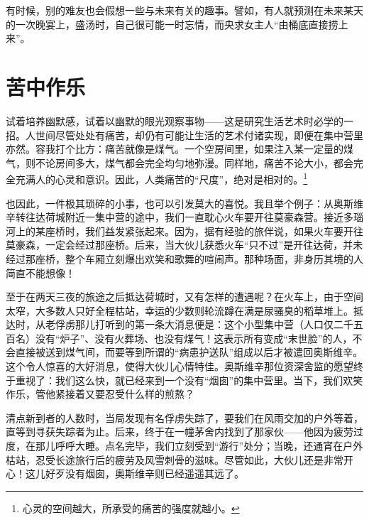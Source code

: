 \documentclass[11pt,oneside]{book}
\begin{document}
\begin{common-format}
有时候，别的难友也会假想一些与未来有关的趣事。譬如，有人就预测在未来某天的一次晚宴上，盛汤时，自己很可能一时忘情，而央求女主人“由桶底直接捞上来”。


\section{苦中作乐}
试着培养幽默感，试着以幽默的眼光观察事物——这是研究生活艺术时必学的一招。人世间尽管处处有痛苦，却仍有可能让生活的艺术付诸实现，即便在集中营里亦然。容我打个比方：痛苦就像是煤气。一个空房间里，如果注入某一定量的煤气，则不论房间多大，煤气都会完全均匀地弥漫。同样地，痛苦不论大小，都会完全充满人的心灵和意识。因此，人类痛苦的“尺度”，绝对是相对的。\footnote{心灵的空间越大，所承受的痛苦的强度就越小。}

也因此，一件极其琐碎的小事，也可以引发莫大的喜悦。我且举个例子：从奥斯维辛转往达荷城附近一集中营的途中，我们一直耽心火车要开往莫豪森营。接近多瑙河上的某座桥时，我们益发紧张起来。因为，据有经验的旅伴说，如果火车要开往莫豪森，一定会经过那座桥。后来，当大伙儿获悉火车“只不过”是开往达荷，并未经过那座桥，整个车厢立刻爆出欢笑和歌舞的喧闹声。那种场面，非身历其境的人简直不能想像！

至于在两天三夜的旅途之后抵达荷城时，又有怎样的遭遇呢？在火车上，由于空间太窄，大多数人只好全程枯站，幸运的少数则轮流蹲在满是尿骚臭的稻草堆上。抵达时，从老俘虏那儿打听到的第一条大消息便是：这个小型集中营（人口仅二千五百名）没有“炉子”、没有火葬场、也没有煤气！这表示所有变成“末世脸”的人，不会直接被送到煤气间，而要等到所谓的“病患护送队”组成以后才被遣回奥斯维辛。这个令人惊喜的大好消息，使得大伙儿心情特佳。奥斯维辛那位资深舍监的愿望终于重视了：我们这么快，就已经来到一个没有“烟囱”的集中营里。当下，我们欢笑作乐，管他紧接着又要忍受什么样的煎熬？

清点新到者的人数时，当局发现有名俘虏失踪了，要我们在风雨交加的户外等着，直等到寻获失踪者为止。后来，终于在一幢茅舍内找到了那家伙——他因为疲劳过度，在那儿呼呼大睡。点名完毕，我们立刻受到“游行”处分；当晚，还通宵在户外枯站，忍受长途旅行后的疲劳及风雪刺骨的滋味。尽管如此，大伙儿还是非常开心！这儿好歹没有烟囱，奥斯维辛则已经遥遥其远了。


\end{common-format}
\end{document}
